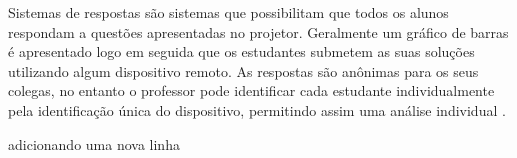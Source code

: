 Sistemas de respostas são sistemas que possibilitam que todos os alunos
respondam a questões apresentadas no projetor. Geralmente um gráfico de barras
é apresentado logo em seguida que os estudantes submetem as suas soluções
utilizando algum dispositivo remoto. As respostas são anônimas para os seus colegas,
no entanto o professor pode identificar cada estudante individualmente pela
identificação única do dispositivo, permitindo assim uma análise individual \cite[p. 1]{Kay2009}.

adicionando uma nova linha
